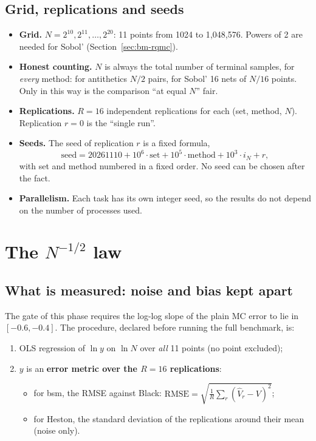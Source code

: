 \subsection{Grid, replications and seeds}
\begin{itemize}
\item \textbf{Grid.} $N=2^{10},2^{11},\dots,2^{20}$: 11 points from 1024 to 1{,}048{,}576. Powers of 2 are needed for
Sobol' (Section~\ref{sec:bm-rqmc}).
\item \textbf{Honest counting.} $N$ is always the total number of terminal samples, for \emph{every} method: for
antithetics $N/2$ pairs, for Sobol' 16 nets of $N/16$ points. Only in this way is the comparison ``at equal $N$''
fair.
\item \textbf{Replications.} $R=16$ independent replications for each (set, method, $N$). Replication $r=0$ is the
``single run''.
\item \textbf{Seeds.} The seed of replication $r$ is a fixed formula,
\[
\text{seed}=20261110+10^6\cdot\text{set}+10^5\cdot\text{method}+10^3\cdot i_N+r ,
\]
with set and method numbered in a fixed order. No seed can be chosen after the fact.
\item \textbf{Parallelism.} Each task has its own integer seed, so the results do not depend on the number of
processes used.
\end{itemize}

\section{\texorpdfstring{The $N^{-1/2}$ law}{The N\textasciicircum(-1/2) law}}
\label{sec:bm-pendenza}
\subsection{What is measured: noise and bias kept apart}
The gate of this phase requires the log-log slope of the plain MC error to lie in $[-0.6,-0.4]$. The procedure,
declared before running the full benchmark, is:
\begin{enumerate}
\item OLS regression of $\ln y$ on $\ln N$ over \emph{all} 11 points (no point excluded);
\item $y$ is an \textbf{error metric over the $R=16$ replications}:
\begin{itemize}
\item for bsm, the RMSE against Black: $\mathrm{RMSE}=\sqrt{\tfrac1R\sum_r(\hat V_r-V)^2}$;
\item for Heston, the standard deviation of the replications around their mean (noise only).
\end{itemize}
\end{enumerate}

